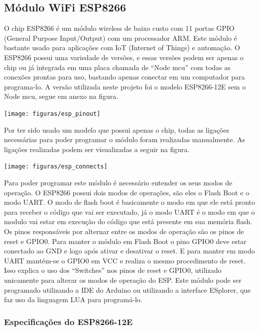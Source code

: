 \subsection{Módulo WiFi ESP8266}
	O chip ESP8266 é um módulo wireless de baixo custo com 11 portas GPIO (General Purpose Input/Output) com um processador ARM. Este módulo é bastante usado para aplicações com IoT (Internet of Things) e automação.
	O ESP8266 possui uma variedade de versões, e essas versões podem ser apenas o chip ou já integrada em uma placa chamada de “Node mcu” com todas as conexões prontas para uso, bastando apenas conectar em um computador para programa-lo. A versão utilizada neste projeto foi o modelo ESP8266-12E sem o Node mcu, segue em anexo na figura.
    \begin{center}
    	\texttt{[image: figuras/esp\_pinout]}
    \end{center}
	Por ter sido usado um modelo que possui apenas o chip, todas as ligações necessárias para poder programar o módulo foram realizadas manualmente. As ligações realizadas podem ser visualizadas a seguir na figura.
    \begin{center}
    	\texttt{[image: figuras/esp\_connects]}
    \end{center}
    Para poder programar este módulo é necessário entender os seus modos de operação. O ESP8266 possui dois modos de operações, são eles o Flash Boot e o modo UART. O modo de flash boot é basicamente o modo em que ele está pronto para receber o código que vai ser executado, já o modo UART é o modo em que o modulo vai estar em execução do código que está presente em sua memória flash. Os pinos responsáveis por alternar entre os modos de operação são os pinos de reset e GPIO0. Para manter o módulo em Flash Boot o pino GPIO0 deve estar conectado ao GND e logo após ativar e desativar o reset. E para manter em modo UART mantém-se o GPIO0 em VCC e realiza o mesmo procedimento de reset. Isso explica o uso dos “Switches” nos pinos de reset e GPIO0, utilizado unicamente para alterar os modos de operação do ESP.
	Este módulo pode ser programado utilizando a IDE do Arduino ou utilizando a interface ESplorer, que faz uso da linguagem LUA para programá-lo.

\subsubsection{Especificações do ESP8266-12E}

